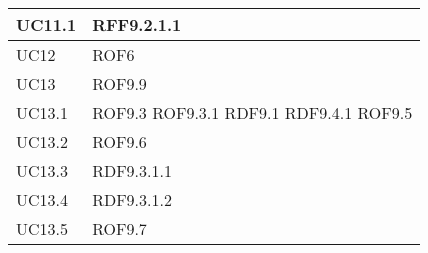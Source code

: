 \documentclass[../AnalisideiRequisiti.tex]{subfiles}
\begin{document}
\begin{longtable}{| p{4cm} | p{4cm} |}
		\hline
		\newline UC11.1 &  \newline RFF9.2.1.1 \\[1em]
		\hline
		\newline UC12 &  \newline ROF6 \\[1em]
		\hline			
		\newline UC13 &  \newline ROF9.9 \\[1em]
		\hline			
		\newline UC13.1 &  \newline ROF9.3 \newline ROF9.3.1 \newline RDF9.1 \newline RDF9.4.1 \newline ROF9.5 \\[1em]
		\hline
		\newline UC13.2 &  \newline ROF9.6 \\[1em]
		\hline
		\newline UC13.3 &   \newline RDF9.3.1.1 \\[1em]
		\hline
		\newline UC13.4 &  \newline RDF9.3.1.2 \\[1em]
		\hline
		\newline UC13.5 &  \newline ROF9.7 \\[1em]
		\hline
	\end{longtable}
\newpage
\end{document}
